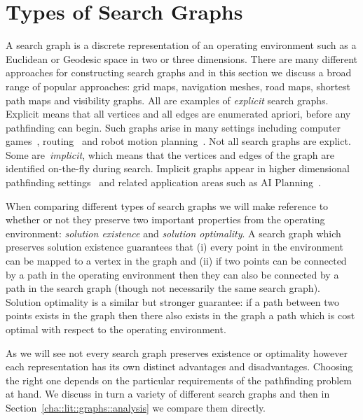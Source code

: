 \section{Types of Search Graphs}
\label{cha::lit::graphs}

A search graph is a discrete representation of an operating environment such as
a Euclidean or Geodesic space in two or three dimensions.  There are many
different approaches for constructing search graphs and in this section we 
discuss a broad range of popular approaches: grid maps, navigation meshes, road
maps, shortest path maps and visibility graphs.  All are examples of
\emph{explicit} search graphs.  Explicit means that all vertices and all edges
are enumerated apriori, before any pathfinding can begin.  Such graphs arise in
many settings including computer games~\citep{davis00,tozour02,champandard09},
routing~\citep{sanders05,goldberg06} and robot motion
planning~\citep{latombe91,choset05}.  Not all search graphs are explict.  Some
are~\emph{implicit}, which means that the vertices and edges of the graph are
identified on-the-fly during search.  Implicit graphs appear in higher
dimensional pathfinding settings~\citep{lavalle98,bohlin00} and related
application areas such as AI Planning~\citep{russel03}.

When comparing different types of search graphs we will make reference to whether
or not they preserve two important properties from the operating environment:
\emph{solution existence} and \emph{solution optimality}.
A search graph which preserves solution existence guarantees that (i) every point
in the environment can be mapped to a vertex in the graph and (ii) if two
points can be connected by a path in the operating environment then they
can also be connected by a path in the search graph (though not necessarily the
same search graph). 
Solution optimality is a similar but stronger guarantee: if a path between two
points exists in the graph then there also exists in the graph a path which is 
cost optimal with respect to the operating environment.


As we will see not every search graph preserves existence or optimality however
each representation has its own distinct advantages and disadvantages. Choosing the
right one depends on the particular requirements of the pathfinding problem at
hand. We discuss in turn a variety of different search graphs and then in
Section~\ref{cha::lit::graphs::analysis} we compare them directly.

